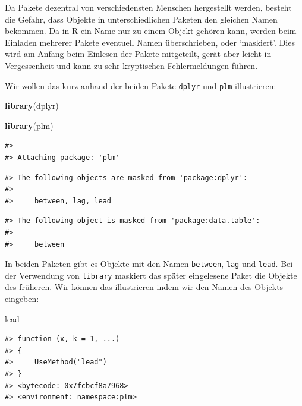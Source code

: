 \documentclass[]{book}
\newenvironment{Shaded}{\begin{snugshade}}{\end{snugshade}}
\newcommand{\KeywordTok}[1]{\textcolor[rgb]{0.13,0.29,0.53}{\textbf{#1}}}
\newcommand{\NormalTok}[1]{#1}
\begin{document}
Da Pakete dezentral von verschiedensten Menschen hergestellt werden,
besteht die Gefahr, dass Objekte in unterschiedlichen Paketen den
gleichen Namen bekommen. Da in R ein Name nur zu einem Objekt gehören
kann, werden beim Einladen mehrerer Pakete eventuell Namen
überschrieben, oder `maskiert'. Dies wird am Anfang beim Einlesen der
Pakete mitgeteilt, gerät aber leicht in Vergessenheit und kann zu sehr
kryptischen Fehlermeldungen führen.

Wir wollen das kurz anhand der beiden Pakete \texttt{dplyr} und
\texttt{plm} illustrieren:

\begin{Shaded}
\begin{Highlighting}[]
\KeywordTok{library}\NormalTok{(dplyr)}
\end{Highlighting}
\end{Shaded}

\begin{Shaded}
\begin{Highlighting}[]
\KeywordTok{library}\NormalTok{(plm)}
\end{Highlighting}
\end{Shaded}

\begin{verbatim}
#> 
#> Attaching package: 'plm'
\end{verbatim}

\begin{verbatim}
#> The following objects are masked from 'package:dplyr':
#> 
#>     between, lag, lead
\end{verbatim}

\begin{verbatim}
#> The following object is masked from 'package:data.table':
#> 
#>     between
\end{verbatim}

In beiden Paketen gibt es Objekte mit den Namen \texttt{between},
\texttt{lag} und \texttt{lead}. Bei der Verwendung von \texttt{library}
maskiert das später eingelesene Paket die Objekte des früheren. Wir
können das illustrieren indem wir den Namen des Objekts eingeben:

\begin{Shaded}
\begin{Highlighting}[]
\NormalTok{lead}
\end{Highlighting}
\end{Shaded}

\begin{verbatim}
#> function (x, k = 1, ...) 
#> {
#>     UseMethod("lead")
#> }
#> <bytecode: 0x7fcbcf8a7968>
#> <environment: namespace:plm>
\end{verbatim}
\end{document}
